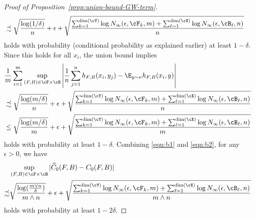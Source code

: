 \documentclass[11pt]{article}
\begin{document}
\begin{proof}[Proof of Proposition~\ref{prop:union-bound-GW-term}]
\begin{equation*}
\begin{split}
			& \precsim \sqrt{\frac{\log(1 / \delta)}{n}} + \epsilon + \sqrt{\frac{\sum_{k = 1}^{\mathrm{dim}(\cY)} \log N_{\infty}(\epsilon, \cF_k, m) + \sum_{\ell = 1}^{\mathrm{dim}(\cX)} \log N_{\infty}(\epsilon, \cB_\ell, n)}{n}} 
		\end{split}
	\end{equation*}
	holds with probability (conditional probability as explained earlier) at least $1 - \delta$. Since this holds for all $x_i$, the union bound implies
	\begin{equation}
		\label{eqn:b2}
		\begin{split}
			& \frac{1}{m} \sum_{i=1}^{m} \sup_{(F, B) \in \cF \times \cB} \left|\frac{1}{n} \sum_{j=1}^{n} h_{F, B}(x_i, y_j) - \E_{y \sim \nu} h_{F, B}(x_i, y)\right| \\
			& \precsim 
			\sqrt{\frac{\log(m / \delta)}{n}} + \epsilon + \sqrt{\frac{\sum_{k = 1}^{\mathrm{dim}(\cY)} \log N_{\infty}(\epsilon, \cF_k, m) + \sum_{\ell = 1}^{\mathrm{dim}(\cX)} \log N_{\infty}(\epsilon, \cB_\ell, n)}{n}} \\
			& \le \sqrt{\frac{\log(m / \delta)}{m}} + \epsilon + \sqrt{\frac{\sum_{k = 1}^{\mathrm{dim}(\cY)} \log N_{\infty}(\epsilon, \cF_k, m) + \sum_{\ell = 1}^{\mathrm{dim}(\cX)} \log N_{\infty}(\epsilon, \cB_\ell, n)}{m}} 
		\end{split}
	\end{equation}
	holds with probability at least $1 - \delta$. Combining \eqref{eqn:b1} and \eqref{eqn:b2}, for any $\epsilon > 0$, we have
	\begin{equation*}
		\begin{split}
			& \sup_{(F, B) \in \cF \times \cB} |\widehat{C}_0(F, B) - C_0(F, B)| \\
			\precsim
			& \sqrt{\frac{\log(\tfrac{m \vee n}{\delta})}{m \wedge n}} + \epsilon + \sqrt{\frac{\sum_{k = 1}^{\mathrm{dim}(\cY)} \log N_{\infty}(\epsilon, \cF_k, m) + \sum_{\ell = 1}^{\mathrm{dim}(\cX)} \log N_{\infty}(\epsilon, \cB_\ell, n)}{m \wedge n}}
		\end{split}
	\end{equation*}
	holds with probability at least $1 - 2 \delta$.
\end{proof}
\end{document}
